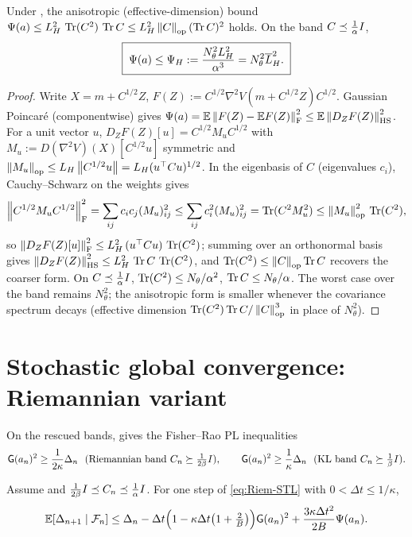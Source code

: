 \begin{lemma}
\label{lem:Psi-Hg}
Under , the anisotropic (effective-dimension) bound
$\Psi(a)\leq L_H^2\,\operatorname{Tr}(C^2)\,\operatorname{Tr} C\leq L_H^2\left\lVert C\right\rVert_{\mathrm{op}}(\operatorname{Tr} C)^2$ holds. On the band
$C\preceq\tfrac1\alpha I$,
\begin{equation}
\label{eq:Psi-Hg}
    \boxed{\;\Psi(a)\leq\Psi_H:=\frac{N_\theta^2L_H^2}{\alpha^3}=N_\theta^2\overline{L}_H^2 .\;}
\end{equation}
\end{lemma}

\begin{proof}
Write $X=m+C^{1/2}Z$, $F(Z):=C^{1/2}\nabla^2V(m+C^{1/2}Z)C^{1/2}$. Gaussian Poincar\'e (componentwise)
gives $\Psi(a)=\mathbb{E}\left\lVert F(Z)-\mathbb{E} F(Z)\right\rVert_{\mathrm{F}}^2\leq\mathbb{E}\left\lVert D_ZF(Z)\right\rVert_{\mathrm{HS}}^2$. For a unit vector
$u$, $D_ZF(Z)[u]=C^{1/2}M_uC^{1/2}$ with $M_u:=D(\nabla^2V)(X)[C^{1/2}u]$ symmetric and
$\left\lVert M_u\right\rVert_{\mathrm{op}}\leq L_H\left\lVert C^{1/2}u\right\rVert=L_H(u^\top Cu)^{1/2}$. In the eigenbasis of $C$ (eigenvalues
$c_i$), Cauchy--Schwarz on the weights gives
\[
    \left\lVert C^{1/2}M_uC^{1/2}\right\rVert_{\mathrm{F}}^2=\sum_{ij}c_ic_j(M_u)_{ij}^2
    \leq\sum_{ij}c_i^2(M_u)_{ij}^2=\operatorname{Tr}(C^2M_u^2)\leq\left\lVert M_u\right\rVert_{\mathrm{op}}^2\,\operatorname{Tr}(C^2),
\]
so $\left\lVert D_ZF(Z)[u]\right\rVert_{\mathrm{F}}^2\leq L_H^2\,(u^\top Cu)\,\operatorname{Tr}(C^2)$; summing over an orthonormal basis
gives $\left\lVert D_ZF(Z)\right\rVert_{\mathrm{HS}}^2\leq L_H^2\,\operatorname{Tr} C\,\operatorname{Tr}(C^2)$, and $\operatorname{Tr}(C^2)\leq\left\lVert C\right\rVert_{\mathrm{op}}\operatorname{Tr} C$
recovers the coarser form. On $C\preceq\tfrac1\alpha I$, $\operatorname{Tr}(C^2)\leq N_\theta/\alpha^2$,
$\operatorname{Tr} C\leq N_\theta/\alpha$. The worst case over the band remains $N_\theta^2$; the anisotropic form
is smaller whenever the covariance spectrum decays (effective dimension
$\operatorname{Tr}(C^2)\operatorname{Tr} C/\left\lVert C\right\rVert_{\mathrm{op}}^3$ in place of $N_\theta^2$).
\end{proof}
\section{Stochastic global convergence: Riemannian variant}
\label{sec:stoch-Riem}

On the rescued bands,  gives the Fisher--Rao PL inequalities
\begin{equation}
\label{eq:PL-bands}
    \mathsf{G}(a_n)^2\geq\frac1{2\kappa}\Delta_n\ \ (\text{Riemannian band }C_n\succeq\tfrac1{2\beta}I),
    \qquad
    \mathsf{G}(a_n)^2\geq\frac1\kappa\Delta_n\ \ (\text{KL band }C_n\succeq\tfrac1\beta I).
\end{equation}

\begin{lemma}
\label{lem:Riem-onestep-stoch}
Assume  and $\tfrac1{2\beta}I\preceq C_n\preceq\tfrac1\alpha I$. For
one step of \eqref{eq:Riem-STL} with $0<\Delta t\leq1/\kappa$,
\begin{equation}
\label{eq:Riem-onestep-Psi}
    \mathbb{E}[\Delta_{n+1}\mid\mathcal{F}_n]
    \leq\Delta_n-\Delta t\Bigl(1-\kappa\Delta t\bigl(1+\tfrac2B\bigr)\Bigr)\mathsf{G}(a_n)^2
    +\frac{3\kappa\Delta t^2}{2B}\Psi(a_n).
\end{equation}
\end{lemma}

